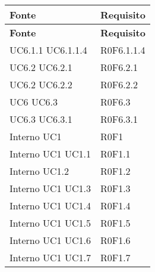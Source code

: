 \def\arraystretch{1.5}
\begin{longtable}{p{2.5cm}!{\VRule[1pt]}p{2.5cm}}
\color{white} \textbf{Fonte} & \color{white} \textbf{Requisito} \\ 
\endfirsthead 
{} 
\color{white} \textbf{Fonte} & \color{white} \textbf{Requisito} \\ 
\endhead 
{} \newline UC6.1.1
 \newline UC6.1.1.4
 & R0F6.1.1.4 \\
 \newline UC6.2
 \newline UC6.2.1
 & R0F6.2.1 \\
 \newline UC6.2
 \newline UC6.2.2
 & R0F6.2.2 \\
 \newline UC6
 \newline UC6.3
 & R0F6.3 \\
 \newline UC6.3
 \newline UC6.3.1
 & R0F6.3.1 \\
Interno \newline UC1
 & R0F1 \\
Interno \newline UC1
 \newline UC1.1
 & R0F1.1 \\
Interno \newline UC1.2
 & R0F1.2 \\
Interno \newline UC1
 \newline UC1.3
 & R0F1.3 \\
Interno \newline UC1
 \newline UC1.4
 & R0F1.4 \\
Interno \newline UC1
 \newline UC1.5
 & R0F1.5 \\
Interno \newline UC1
 \newline UC1.6
 & R0F1.6 \\
Interno \newline UC1
 \newline UC1.7
 & R0F1.7 \\

\end{longtable}
